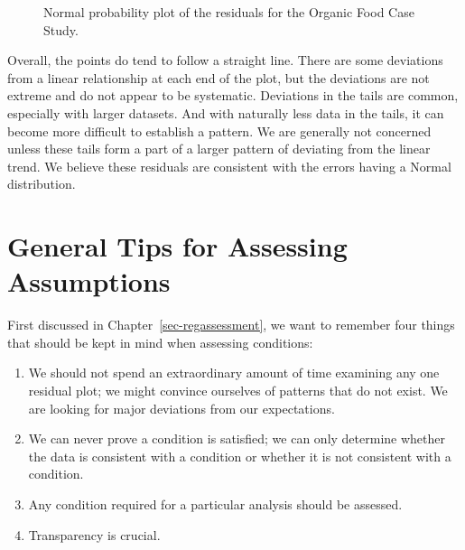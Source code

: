 \documentclass[
  letterpaper,
  DIV=11,
  numbers=noendperiod]{scrreprt}
\providecommand{\tightlist}{%
  \setlength{\itemsep}{0pt}\setlength{\parskip}{0pt}}\usepackage{longtable,booktabs,array}
\theoremstyle{definition}
\theoremstyle{definition}
\theoremstyle{plain}
\theoremstyle{remark}
\begin{document}
\begin{figure}


\caption{\label{fig-anovaassessment-normal-organic}Normal probability
plot of the residuals for the Organic Food Case Study.}

\end{figure}%

Overall, the points do tend to follow a straight line. There are some
deviations from a linear relationship at each end of the plot, but the
deviations are not extreme and do not appear to be systematic.
Deviations in the tails are common, especially with larger datasets. And
with naturally less data in the tails, it can become more difficult to
establish a pattern. We are generally not concerned unless these tails
form a part of a larger pattern of deviating from the linear trend. We
believe these residuals are consistent with the errors having a Normal
distribution.

\section{General Tips for Assessing
Assumptions}\label{general-tips-for-assessing-assumptions-1}

First discussed in Chapter~\ref{sec-regassessment}, we want to remember
four things that should be kept in mind when assessing conditions:

\begin{enumerate}
\def\labelenumi{\arabic{enumi}.}
\tightlist
\item
  We should not spend an extraordinary amount of time examining any one
  residual plot; we might convince ourselves of patterns that do not
  exist. We are looking for major deviations from our expectations.
\item
  We can never prove a condition is satisfied; we can only determine
  whether the data is consistent with a condition or whether it is not
  consistent with a condition.
\item
  Any condition required for a particular analysis should be assessed.
\item
  Transparency is crucial.
\end{enumerate}
\end{document}
